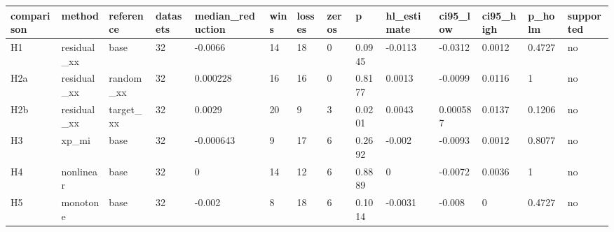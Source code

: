 \begin{tabular}{llllllllllllll}
\toprule
comparison & method & reference & datasets & median\_reduction & wins & losses & zeros & p & hl\_estimate & ci95\_low & ci95\_high & p\_holm & supported \\
\midrule
H1 & residual\_xx & base & 32 & -0.0066 & 14 & 18 & 0 & 0.0945 & -0.0113 & -0.0312 & 0.0012 & 0.4727 & no \\
H2a & residual\_xx & random\_xx & 32 & 0.000228 & 16 & 16 & 0 & 0.8177 & 0.0013 & -0.0099 & 0.0116 & 1 & no \\
H2b & residual\_xx & target\_xx & 32 & 0.0029 & 20 & 9 & 3 & 0.0201 & 0.0043 & 0.000587 & 0.0137 & 0.1206 & no \\
H3 & xp\_mi & base & 32 & -0.000643 & 9 & 17 & 6 & 0.2692 & -0.002 & -0.0093 & 0.0012 & 0.8077 & no \\
H4 & nonlinear & base & 32 & 0 & 14 & 12 & 6 & 0.8889 & 0 & -0.0072 & 0.0036 & 1 & no \\
H5 & monotone & base & 32 & -0.002 & 8 & 18 & 6 & 0.1014 & -0.0031 & -0.008 & 0 & 0.4727 & no \\
\bottomrule
\end{tabular}
